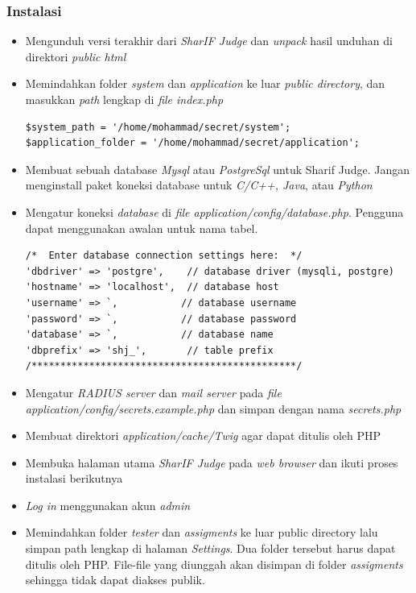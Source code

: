 \documentclass[a4paper,twoside]{article}
\begin{document}
\begin{enumerate}
		\subsubsection*{Instalasi}
		\label{subsubsec:instalasi}
		\begin{itemize}
			\item Mengunduh versi terakhir dari \textit{SharIF Judge} dan \textit{unpack} hasil unduhan di direktori \textit{public html}
			\item Memindahkan folder \textit{system} dan \textit{application} ke luar \textit{public directory}, dan masukkan \textit{path} lengkap di \textit{file index.php}
			\begin{lstlisting}[basicstyle=\ttfamily, frame=single,
			columns=fullflexible, keepspaces=true, breaklines=true, label=ls:2]
$system_path = '/home/mohammad/secret/system';
$application_folder = '/home/mohammad/secret/application';
			\end{lstlisting}
			\item Membuat sebuah database \textit{Mysql} atau \textit{PostgreSql} untuk Sharif Judge. Jangan menginstall paket koneksi database untuk \textit{C/C++, Java}, atau \textit{Python}
			\item Mengatur koneksi \textit{database} di \textit{file application/config/database.php}. Pengguna dapat
			menggunakan awalan untuk nama tabel.
			\begin{lstlisting}[basicstyle=\ttfamily, frame=single,
			columns=fullflexible, keepspaces=true, breaklines=true, label=ls:3]
/*  Enter database connection settings here:  */
'dbdriver' => 'postgre',    // database driver (mysqli, postgre)
'hostname' => 'localhost',  // database host
'username' => `,           // database username
'password' => `,           // database password
'database' => `,           // database name
'dbprefix' => 'shj_',       // table prefix
/**********************************************/
			\end{lstlisting}
			\item Mengatur \textit{RADIUS server} dan \textit{mail server} pada \textit{file application/config/secrets.example.php} dan simpan dengan nama \textit{secrets.php}
			\item Membuat direktori \textit{application/cache/Twig} agar dapat ditulis oleh PHP
			\item Membuka halaman utama \textit{SharIF Judge} pada \textit{web browser} dan ikuti proses instalasi berikutnya
			\item \textit{Log in} menggunakan akun \textit{admin}
			\item Memindahkan folder \textit{tester} dan \textit{assigments} ke luar public directory lalu simpan path lengkap di halaman \textit{Settings}. Dua folder tersebut harus dapat ditulis oleh PHP. File-file yang diunggah
			akan disimpan di folder \textit{assigments} sehingga tidak dapat diakses publik.
		\end{itemize}
		

\end{enumerate}
\end{document}
